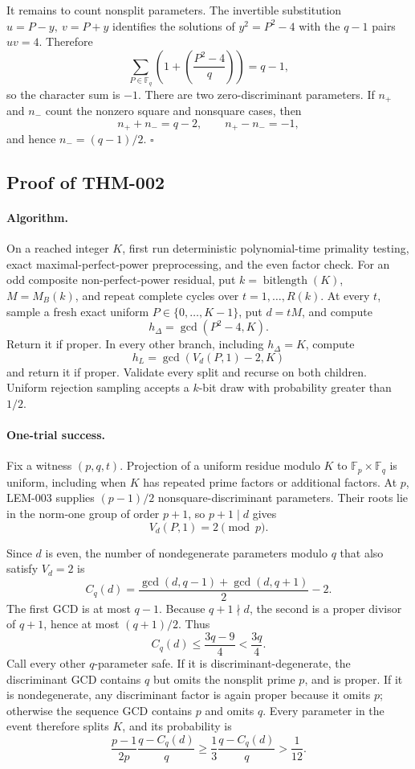 \documentclass[11pt]{article}
\begin{document}
It remains to count nonsplit parameters. The invertible substitution
\(u=P-y,\ v=P+y\) identifies the solutions of
\(y^2=P^2-4\) with the \(q-1\) pairs \(uv=4\). Therefore
\[
\sum_{P\in\mathbb F_q}
\left(1+\left(\frac{P^2-4}{q}\right)\right)=q-1,
\]
so the character sum is \(-1\). There are two zero-discriminant parameters.
If \(n_+\) and \(n_-\) count the nonzero square and nonsquare cases, then
\[
n_++n_-=q-2,\qquad n_+-n_-=-1,
\]
and hence \(n_-=(q-1)/2\). \(\square\)

\subsection{Proof of THM-002}\label{proof:THM-002}

\paragraph{Algorithm.}
On a reached integer \(K\), first run deterministic polynomial-time
primality testing, exact maximal-perfect-power preprocessing, and the even
factor check. For an odd composite non-perfect-power residual, put
\(k=\operatorname{bitlength}(K)\), \(M=M_B(k)\), and repeat complete cycles over
\(t=1,\ldots,R(k)\). At every \(t\), sample a fresh exact uniform
\(P\in\{0,\ldots,K-1\}\), put \(d=tM\), and compute
\[
h_\Delta=\gcd(P^2-4,K).
\]
Return it if proper. In every other branch, including \(h_\Delta=K\),
compute
\[
h_L=\gcd(V_d(P,1)-2,K)
\]
and return it if proper. Validate every split and recurse on both children.
Uniform rejection sampling accepts a \(k\)-bit draw with probability greater
than \(1/2\).

\paragraph{One-trial success.}
Fix a witness \((p,q,t)\). Projection of a uniform residue modulo \(K\) to
\(\mathbb F_p\times\mathbb F_q\) is uniform, including when \(K\) has repeated
prime factors or additional factors. At \(p\), LEM-003 supplies
\((p-1)/2\) nonsquare-discriminant parameters. Their roots lie in the
norm-one group of order \(p+1\), so \(p+1\mid d\) gives
\[
V_d(P,1)=2\pmod p.
\]

Since \(d\) is even, the number of nondegenerate parameters modulo \(q\)
that also satisfy \(V_d=2\) is
\[
C_q(d)=
\frac{\gcd(d,q-1)+\gcd(d,q+1)}2-2.
\]
The first GCD is at most \(q-1\). Because \(q+1\nmid d\), the second is a
proper divisor of \(q+1\), hence at most \((q+1)/2\). Thus
\[
C_q(d)\le\frac{3q-9}{4}<\frac{3q}{4}.
\]
Call every other \(q\)-parameter safe. If it is discriminant-degenerate, the
discriminant GCD contains \(q\) but omits the nonsplit prime \(p\), and is
proper. If it is nondegenerate, any discriminant factor is again proper
because it omits \(p\); otherwise the sequence GCD contains \(p\) and omits
\(q\). Every parameter in the event therefore splits \(K\), and its
probability is
\[
\frac{p-1}{2p}\frac{q-C_q(d)}q
\ge\frac13\frac{q-C_q(d)}q>\frac1{12}.
\]
\end{document}

